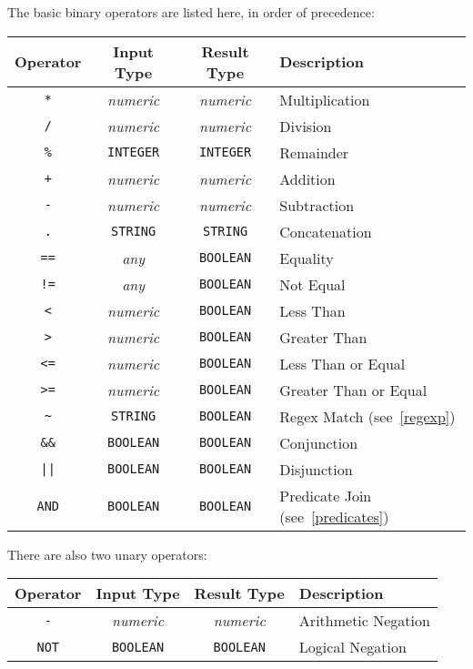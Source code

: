 \documentclass[letterpaper,10pt]{article}
\begin{document}
The basic binary operators are listed here, in order of precedence:
\begin{center}
    \begin{tabular}{c | c | c | l}
        \hline
        Operator & Input Type & Result Type & Description \\ \hline \hline
        \texttt{*}  & \emph{numeric} & \emph{numeric} & Multiplication \\ \hline
        \texttt{/}  & \emph{numeric} & \emph{numeric} & Division \\ \hline
        \texttt{\%} & \texttt{INTEGER} & \texttt{INTEGER} & Remainder \\ \hline
        \texttt{+}  & \emph{numeric} & \emph{numeric} & Addition \\ \hline
        \texttt{-}  & \emph{numeric} & \emph{numeric} & Subtraction \\ \hline
        \texttt{.}  & \texttt{STRING} & \texttt{STRING} & Concatenation \\ \hline
        \texttt{==} & \emph{any} & \texttt{BOOLEAN} & Equality \\ \hline
        \texttt{!=} & \emph{any} & \texttt{BOOLEAN} & Not Equal \\ \hline
        \texttt{<} & \emph{numeric} & \texttt{BOOLEAN} & Less Than \\ \hline
        \texttt{>} & \emph{numeric} & \texttt{BOOLEAN} & Greater Than \\ \hline
        \texttt{<=} & \emph{numeric} & \texttt{BOOLEAN} & Less Than or Equal \\ \hline
        \texttt{>=} & \emph{numeric} & \texttt{BOOLEAN} & Greater Than or Equal \\ \hline
        \texttt{\~} & \texttt{STRING} & \texttt{BOOLEAN} & Regex Match (see~\ref{regexp})\\ \hline
        \texttt{\&\&} & \texttt{BOOLEAN} & \texttt{BOOLEAN} & Conjunction \\ \hline
        \texttt{||} & \texttt{BOOLEAN} & \texttt{BOOLEAN} & Disjunction \\ \hline
        \texttt{AND} & \texttt{BOOLEAN} & \texttt{BOOLEAN} & Predicate Join (see~\ref{predicates}) \\ \hline
    \end{tabular}
\end{center}

There are also two unary operators:

\begin{center}
    \begin{tabular}{c | c | c | l}
        \hline
        Operator & Input Type & Result Type & Description \\ \hline \hline
        \texttt{-} & \emph{numeric} & \emph{numeric} & Arithmetic Negation \\ \hline
        \texttt{NOT} & \texttt{BOOLEAN} & \texttt{BOOLEAN} & Logical Negation \\ \hline
    \end{tabular}
\end{center}
    
\end{document}

